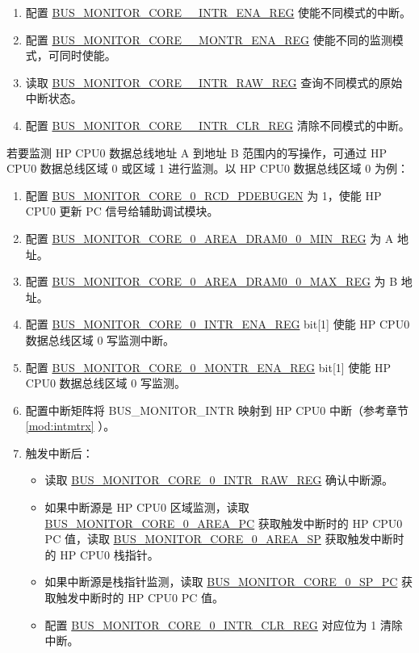 \documentclass[main\_\_CN.tex]{subfiles}
\begin{document}
\begin{enumerate}
\begin{itemize}
        \end{itemize}
    \item 配置 \hyperref[regdesc:BUSMONITORCORE0INTRENAREG]{BUS\_MONITOR\_CORE\_\_INTR\_ENA\_REG} 使能不同模式的中断。
    \item 配置 \hyperref[regdesc:BUSMONITORCORE0MONTRENAREG]{BUS\_MONITOR\_CORE\_\_MONTR\_ENA\_REG} 使能不同的监测模式，可同时使能。
    \item 读取 \hyperref[regdesc:BUSMONITORCORE0INTRRAWREG]{BUS\_MONITOR\_CORE\_\_INTR\_RAW\_REG} 查询不同模式的原始中断状态。
    \item 配置 \hyperref[regdesc:BUSMONITORCORE0INTRCLRREG]{BUS\_MONITOR\_CORE\_\_INTR\_CLR\_REG} 清除不同模式的中断。
\end{enumerate}

若要监测 HP CPU0 数据总线地址 A 到地址 B 范围内的写操作，可通过 HP CPU0 数据总线区域 0 或区域 1 进行监测。以 HP CPU0 数据总线区域 0 为例：

\begin{enumerate}
    \item 配置 \hyperref[fielddesc:BUSMONITORCORE0RCDPDEBUGEN]{BUS\_MONITOR\_CORE\_0\_RCD\_PDEBUGEN} 为 1，使能 HP CPU0 更新 PC 信号给辅助调试模块。
    \item 配置 \hyperref[regdesc:BUSMONITORCORE0AREADRAM00MINREG]{BUS\_MONITOR\_CORE\_0\_AREA\_DRAM0\_0\_MIN\_REG} 为 A 地址。
    \item 配置 \hyperref[regdesc:BUSMONITORCORE0AREADRAM00MAXREG]{BUS\_MONITOR\_CORE\_0\_AREA\_DRAM0\_0\_MAX\_REG} 为 B 地址。
    \item 配置 \hyperref[regdesc:BUSMONITORCORE0INTRENAREG]{BUS\_MONITOR\_CORE\_0\_INTR\_ENA\_REG} bit[1] 使能 HP CPU0 数据总线区域 0 写监测中断。
    \item 配置 \hyperref[regdesc:BUSMONITORCORE0MONTRENAREG]{BUS\_MONITOR\_CORE\_0\_MONTR\_ENA\_REG} bit[1] 使能 HP CPU0 数据总线区域 0 写监测。
    \item 配置中断矩阵将 BUS\_MONITOR\_INTR 映射到 HP CPU0 中断（参考章节 \ref{mod:intmtrx} \textit{}）。
    \item 触发中断后：
    \begin{itemize}
        \item 读取 \hyperref[regdesc:BUSMONITORCORE0INTRRAWREG]{BUS\_MONITOR\_CORE\_0\_INTR\_RAW\_REG} 确认中断源。
        \item 如果中断源是 HP CPU0 区域监测，读取 \hyperref[fielddesc:BUSMONITORCORE0AREAPC]{BUS\_MONITOR\_CORE\_0\_AREA\_PC} 获取触发中断时的 HP CPU0 PC 值，读取 \hyperref[fielddesc:BUSMONITORCORE0AREASP]{BUS\_MONITOR\_CORE\_0\_AREA\_SP} 获取触发中断时的 HP CPU0 栈指针。
        \item 如果中断源是栈指针监测，读取 \hyperref[fielddesc:BUSMONITORCORE0SPPC]{BUS\_MONITOR\_CORE\_0\_SP\_PC} 获取触发中断时的 HP CPU0 PC 值。
        \item 配置 \hyperref[regdesc:BUSMONITORCORE0INTRCLRREG]{BUS\_MONITOR\_CORE\_0\_INTR\_CLR\_REG} 对应位为 1 清除中断。
    \end{itemize}
\end{enumerate}
\end{document}
